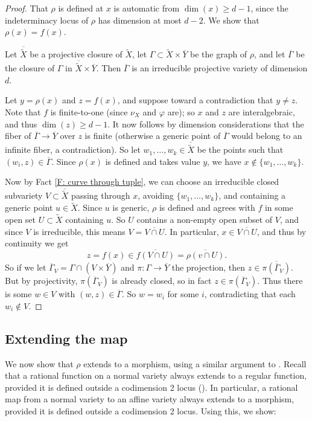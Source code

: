\documentclass{amsart}
\theoremstyle{definition}
\begin{document}
\begin{proof}
That $\rho$ is defined at $x$ is automatic from $\dim(x)\geq d-1$, since the indeterminacy locus of $\rho$ has dimension at most $d-2$. We show that $\rho(x)=f(x)$.

Let $\overline{\widetilde{X}}$ be a projective closure of $\widetilde{X}$, let $\Gamma \subset \widetilde{X} \times \overline{Y}$ be the graph of $\rho$, and let $\overline{\Gamma}$ be the closure of $\Gamma$ in $\overline{\widetilde{X}} \times \overline{Y}$. Then $\overline{\Gamma}$ is an irreducible projective variety of dimension $d$.

Let $y=\rho(x)$ and $z=f(x)$, and suppose toward a contradiction that $y\neq z$. Note that $f$ is finite-to-one (since $\nu_X$ and $\varphi$ are); so $x$ and $z$ are interalgebraic, and thus $\dim(z)\geq d-1$. It now follows by dimension considerations that the fiber of $\overline{\Gamma}\rightarrow\overline Y$ over $z$ is finite (otherwise a generic point of $\overline\Gamma$ would belong to an infinite fiber, a contradiction). So let $w_1,\dots,w_k \in \overline{\widetilde{X}}$ be the points such that $(w_i,z)\in \overline{\Gamma}$. Since $\rho(x)$ is defined and takes value $y$, we have $x\notin\{w_1,\dots,w_k\}$.

Now by Fact \ref{F: curve through tuple}, we can choose an irreducible closed subvariety $V\subset \overline{\widetilde{X}}$ passing through $x$, avoiding $\{w_1,\dots,w_k\}$, and containing a generic point $u\in \widetilde{X}$. Since $u$ is generic, $\rho$ is defined and agrees with $f$ in some open set $U\subset\widetilde X$ containing $u$. So $U$ contains a non-empty open subset of $V$, and since $V$ is irreducible, this means $V=\overline{V\cap U}$. In particular, $x\in\overline{V\cap U}$, and thus by continuity we get $$z=f(x)\in\overline{f(V\cap U)}=\overline{\rho(v\cap U)}.$$ So if we let $\overline{\Gamma}_V=\Gamma\cap(V\times\overline Y)$ and $\pi:\Gamma\rightarrow\overline Y$ the projection, then $z\in\overline{\pi(\overline{\Gamma}_V)}$. But by projectivity, $\pi(\overline{\Gamma}_V)$ is already closed, so in fact $z\in\pi(\overline{\Gamma}_V)$. Thus there is some $w\in V$ with $(w,z)\in\overline\Gamma$. So $w=w_i$ for some $i$, contradicting that each $w_i\notin V$. 
\end{proof}

\subsection{Extending the map} We now show that $\rho$ extends to a morphism, using a similar argument to \cite[Lemma 5.1.4]{KLOS}. Recall that a rational function on a normal variety always extends to a regular function, provided it is defined outside a codimension 2 locus (\cite[Theorem II.6.3A(ii)]{Hartshorne}). In particular, a rational map from a normal variety to an affine variety always extends to a morphism, provided it is defined outside a codimension 2 locus. Using this, we show:
\end{document}
